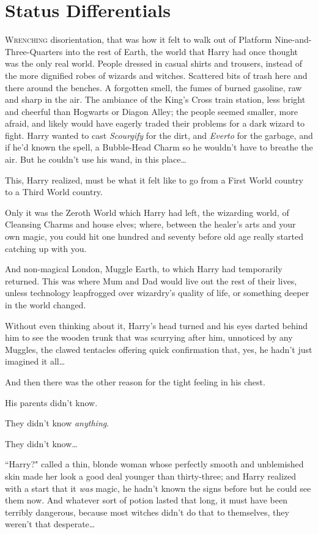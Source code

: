 \chapter{Status Differentials}

\lettrine{W}{renching} disorientation, that was how it felt to walk out of Platform Nine-and-Three-Quarters into the rest of Earth, the world that Harry had once thought was the only real world. People dressed in casual shirts and trousers, instead of the more dignified robes of wizards and witches. Scattered bits of trash here and there around the benches. A forgotten smell, the fumes of burned gasoline, raw and sharp in the air. The ambiance of the King's Cross train station, less bright and cheerful than Hogwarts or Diagon Alley; the people seemed smaller, more afraid, and likely would have eagerly traded their problems for a dark wizard to fight. Harry wanted to cast \emph{Scourgify} for the dirt, and \emph{Everto} for the garbage, and if he'd known the spell, a Bubble-Head Charm so he wouldn't have to breathe the air. But he couldn't use his wand, in this place…

This, Harry realized, must be what it felt like to go from a First World country to a Third World country.

Only it was the Zeroth World which Harry had left, the wizarding world, of Cleansing Charms and house elves; where, between the healer's arts and your own magic, you could hit one hundred and seventy before old age really started catching up with you.

And non-magical London, Muggle Earth, to which Harry had temporarily returned. This was where Mum and Dad would live out the rest of their lives, unless technology leapfrogged over wizardry's quality of life, or something deeper in the world changed.

Without even thinking about it, Harry's head turned and his eyes darted behind him to see the wooden trunk that was scurrying after him, unnoticed by any Muggles, the clawed tentacles offering quick confirmation that, yes, he hadn't just imagined it all…

And then there was the other reason for the tight feeling in his chest.

His parents didn't know.

They didn't know \emph{anything}.

They didn't know…

``Harry?" called a thin, blonde woman whose perfectly smooth and unblemished skin made her look a good deal younger than thirty-three; and Harry realized with a start that it \emph{was} magic, he hadn't known the signs before but he could see them now. And whatever sort of potion lasted that long, it must have been terribly dangerous, because most witches didn't do that to themselves, they weren't that desperate…

